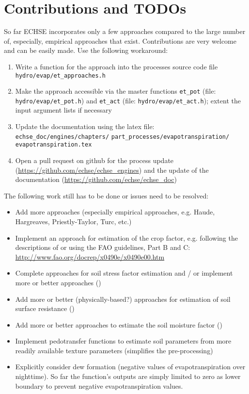 \section{Contributions and TODOs}
So far ECHSE incorporates only a few approaches compared to the large number of, especially, empirical approaches that exist. Contributions are very welcome and can be easily made. Use the following workaround:

\begin{enumerate}
\item Write a function for the approach into the processes source code file \verb!hydro/evap/et_approaches.h!
\item Make the approach accessible via the master functions \verb!et_pot! (file: \verb!hydro/evap/et_pot.h!) and \verb!et_act! (file: \verb!hydro/evap/et_act.h!); extent the input argument lists if necessary
\item Update the documentation using the latex file: \verb!echse_doc/engines/chapters/! \verb!part_processes/evapotranspiration/! \verb!evapotranspiration.tex!
\item Open a pull request on github for the process update (\url{https://github.com/echse/echse_engines}) and the update of the documentation (\url{https://github.com/echse/echse_doc})
\end{enumerate}

The following work still has to be done or issues need to be resolved:

\begin{itemize}
\item Add more approaches (especially empirical approaches, e.g. Haude, Hargreaves, Priestly-Taylor, Turc, etc.)
\item Implement an approach for estimation of the crop factor, e.g. following the descriptions of  or using the FAO guidelines, Part B and C: \url{http://www.fao.org/docrep/x0490e/x0490e00.htm}
\item Complete approaches for soil stress factor estimation and / or implement more or better approaches ()
\item Add more or better (physically-based?) approaches for estimation of soil surface resistance ()
\item Add more or better approaches to estimate the soil moisture factor ()
\item Implement pedotransfer functions to estimate soil parameters from more readily available texture parameters (simplifies the pre-processing)
\item Explicitly consider dew formation (negative values of evapotranspiration over nighttime). So far the function's outputs are simply limited to zero as lower boundary to prevent negative evapotranspiration values.
\end{itemize}
